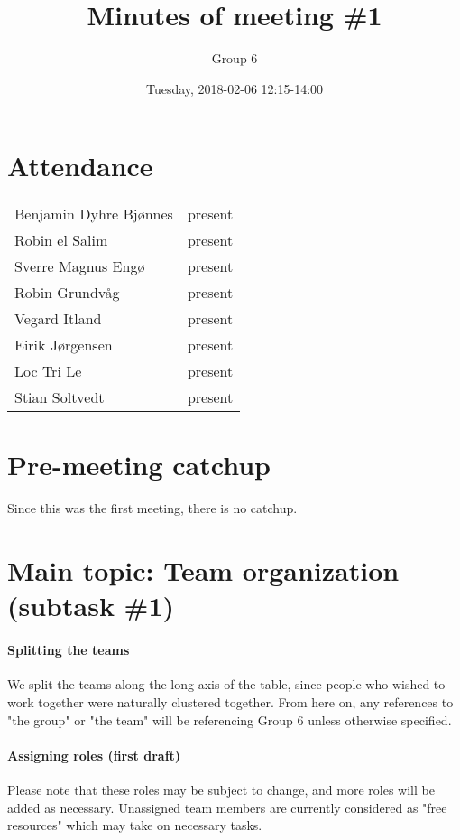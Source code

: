 \documentclass{article}
\title{Minutes of meeting \#1}
\author{Group 6}
\date{Tuesday, 2018-02-06 12:15-14:00}
\begin{document}
\maketitle

\section{Attendance}
\begin{tabular}{l l}
    Benjamin Dyhre Bjønnes     & present \\
    Robin el Salim             & present \\
    Sverre Magnus Engø         & present \\
    Robin Grundvåg             & present \\
    Vegard Itland              & present \\
    Eirik Jørgensen            & present \\
    Loc Tri Le                 & present \\
    Stian Soltvedt             & present
\end{tabular}

\section{Pre-meeting catchup}

Since this was the first meeting, there is no catchup.

\section{Main topic: Team organization (subtask \#1)}

\paragraph{Splitting the teams}

We split the teams along the long axis of the table, since people who wished to work together were naturally clustered together. From here on, any references to "the group" or "the team" will be referencing Group 6 unless otherwise specified.

\paragraph{Assigning roles (first draft)}

Please note that these roles may be subject to change, and more roles will be added as necessary. Unassigned team members are currently considered as "free resources" which may take on necessary tasks.\newline
\end{document}
